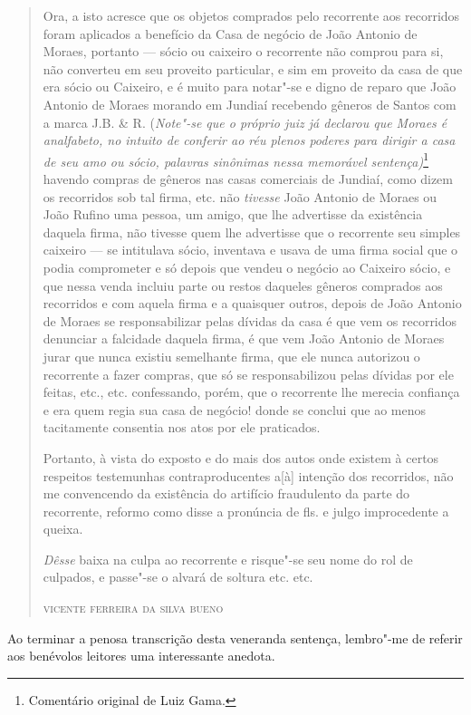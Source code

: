 \begin{quote}
Ora, a isto acresce que os objetos comprados pelo recorrente aos
recorridos foram aplicados a benefício da Casa de negócio de João
Antonio de Moraes, portanto --- sócio ou caixeiro o recorrente não
comprou para si, não converteu em seu proveito particular, e sim em
proveito da casa de que era sócio ou Caixeiro, e é muito para notar"-se e
digno de reparo que João Antonio de Moraes morando em Jundiaí recebendo
gêneros de Santos com a marca J.B. \& R. (\emph{Note"-se que o próprio
juiz já declarou que Moraes é analfabeto, no intuito de conferir ao réu
plenos poderes para dirigir a casa de seu amo ou sócio, palavras
sinônimas nessa memorável sentença)}\footnote{Comentário original de
  Luiz Gama.} havendo compras de gêneros nas casas comerciais de
Jundiaí, como dizem os recorridos sob tal firma, etc. não \emph{tivesse}
João Antonio de Moraes ou João Rufino uma pessoa, um amigo, que lhe
advertisse da existência daquela firma, não tivesse quem lhe advertisse
que o recorrente seu simples caixeiro --- se intitulava sócio, inventava e
usava de uma firma social que o podia comprometer e só depois que vendeu
o negócio ao Caixeiro sócio, e que nessa venda incluiu parte ou restos
daqueles gêneros comprados aos recorridos e com aquela firma e a
quaisquer outros, depois de João Antonio de Moraes se responsabilizar
pelas dívidas da casa é que vem os recorridos denunciar a falcidade
daquela firma, é que vem João Antonio de Moraes jurar que nunca existiu
semelhante firma, que ele nunca autorizou o recorrente a fazer compras,
que só se responsabilizou pelas dívidas por ele feitas, etc., etc.
confessando, porém, que o recorrente lhe merecia confiança e era quem
regia sua casa de negócio! donde se conclui que ao menos tacitamente
consentia nos atos por ele praticados.

Portanto, à vista do exposto e do mais dos autos onde existem à certos
respeitos testemunhas contraproducentes a{[}à{]} intenção dos
recorridos, não me convencendo da existência do artifício fraudulento da
parte do recorrente, reformo como disse a pronúncia de fls. e julgo
improcedente a queixa.

\emph{Dêsse} baixa na culpa ao recorrente e risque"-se seu nome do rol de
culpados, e passe"-se o alvará de soltura etc. etc.

\medskip

\hfill\textsc{vicente ferreira da silva bueno}
\end{quote}

\asterisc

Ao terminar a penosa transcrição desta veneranda sentença, lembro"-me de
referir aos benévolos leitores uma interessante anedota.

